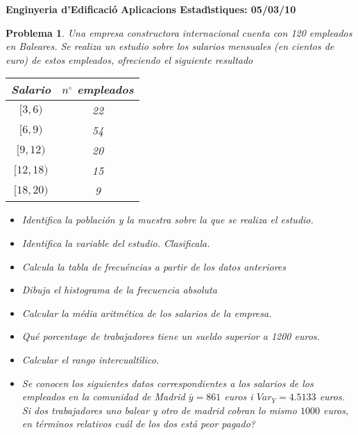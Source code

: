 \documentclass[a4paper,10pt]{article}
\newcounter{prbcont}
\newtheorem{problema}[prbcont]{Problema}
\begin{document}
\begin{center}
\textbf{Enginyeria d'Edificaci\'o}
\textbf{Aplicacions Estad\'{\i}stiques: 05/03/10}
\vspace{0.3cm}
\end{center}

\begin{problema}
Una empresa constructora internacional cuenta con 120 empleados en Baleares. Se realiza un estudio sobre los salarios mensuales (en cientos de euro) de estos empleados, ofreciendo el siguiente resultado
\begin{center}
\begin{tabular}{|c|c|}\hline
Salario & $n^\circ$ empleados \\ \hline
$[3,6)$ & 22 \\ \hline
$[6,9)$ & 54 \\ \hline
$[9,12)$ & 20 \\ \hline
$[12,18)$ & 15 \\ \hline
$[18,20)$ & 9 \\ \hline
\end{tabular}
\end{center}
\begin{itemize}
\item [(a)] Identifica la poblaci\'on y la muestra sobre la que se realiza el estudio.
\item [(b)] Identifica la variable del estudio. Clasificala.
\item [(c)] Calcula la tabla de frecu\'encias a partir de los datos anteriores
\item [(d)] Dibuja el histograma de la frecuencia absoluta
\item [(e)] Calcular la m\'edia aritm\'etica de los salarios de la empresa.
\item [(f)] Qu\'e porcentage de trabajadores tiene un sueldo superior a 1200 euros. 
\item [(g)] Calcular el rango intercualt\'{\i}lico.
\item [(h)] Se conocen los siguientes datos correspondientes a los salarios de los empleados en la comunidad de Madrid $\bar{y}=861$ euros i $Var_{Y}=4.5133$ euros. Si dos trabajadores uno balear y otro de madrid cobran lo mismo $1000$ euros, en t\'erminos relativos cu\'al de los dos est\'a peor pagado?
\end{itemize}
\end{problema}
\end{document}

